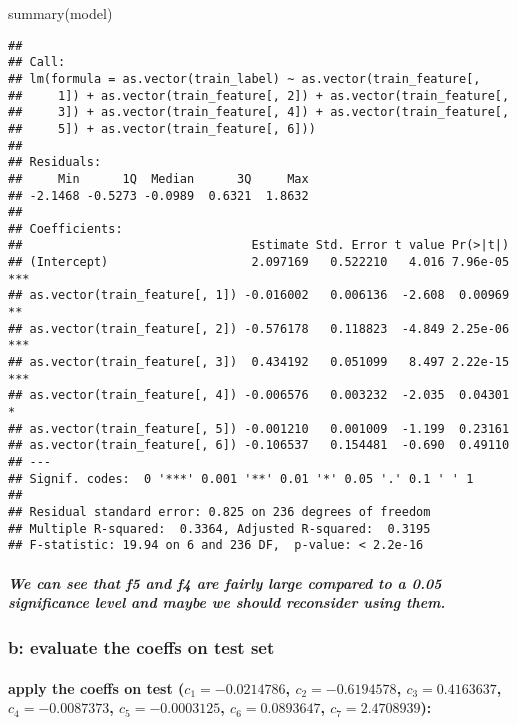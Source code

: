 \documentclass[
]{article}
\newenvironment{Shaded}{\begin{snugshade}}{\end{snugshade}}
\newcommand{\FunctionTok}[1]{\textcolor[rgb]{0.00,0.00,0.00}{#1}}
\newcommand{\NormalTok}[1]{#1}
\begin{document}
\begin{Shaded}
\begin{Highlighting}[]
\FunctionTok{summary}\NormalTok{(model)}
\end{Highlighting}
\end{Shaded}

\begin{verbatim}
## 
## Call:
## lm(formula = as.vector(train_label) ~ as.vector(train_feature[, 
##     1]) + as.vector(train_feature[, 2]) + as.vector(train_feature[, 
##     3]) + as.vector(train_feature[, 4]) + as.vector(train_feature[, 
##     5]) + as.vector(train_feature[, 6]))
## 
## Residuals:
##     Min      1Q  Median      3Q     Max 
## -2.1468 -0.5273 -0.0989  0.6321  1.8632 
## 
## Coefficients:
##                                Estimate Std. Error t value Pr(>|t|)    
## (Intercept)                    2.097169   0.522210   4.016 7.96e-05 ***
## as.vector(train_feature[, 1]) -0.016002   0.006136  -2.608  0.00969 ** 
## as.vector(train_feature[, 2]) -0.576178   0.118823  -4.849 2.25e-06 ***
## as.vector(train_feature[, 3])  0.434192   0.051099   8.497 2.22e-15 ***
## as.vector(train_feature[, 4]) -0.006576   0.003232  -2.035  0.04301 *  
## as.vector(train_feature[, 5]) -0.001210   0.001009  -1.199  0.23161    
## as.vector(train_feature[, 6]) -0.106537   0.154481  -0.690  0.49110    
## ---
## Signif. codes:  0 '***' 0.001 '**' 0.01 '*' 0.05 '.' 0.1 ' ' 1
## 
## Residual standard error: 0.825 on 236 degrees of freedom
## Multiple R-squared:  0.3364, Adjusted R-squared:  0.3195 
## F-statistic: 19.94 on 6 and 236 DF,  p-value: < 2.2e-16
\end{verbatim}

\hypertarget{we-can-see-that-f5-and-f4-are-fairly-large-compared-to-a-0.05-significance-level-and-maybe-we-should-reconsider-using-them.}{%
\subparagraph{We can see that f5 and f4 are fairly large compared to a
0.05 significance level and maybe we should reconsider using
them.}\label{we-can-see-that-f5-and-f4-are-fairly-large-compared-to-a-0.05-significance-level-and-maybe-we-should-reconsider-using-them.}}

\hypertarget{b-evaluate-the-coeffs-on-test-set}{%
\subsubsection{b: evaluate the coeffs on test
set}\label{b-evaluate-the-coeffs-on-test-set}}

\hypertarget{apply-the-coeffs-on-test-c_1-0.0214786-c_2-0.6194578-c_30.4163637-c_4-0.0087373-c_5-0.0003125-c_60.0893647-c_72.4708939}{%
\paragraph{\texorpdfstring{apply the coeffs on test (\(c_1=-0.0214786\),
\(c_2=-0.6194578\), \(c_3=0.4163637\), \(c_4=-0.0087373\),
\(c_5=-0.0003125\), \(c_6=0.0893647\),
\(c_7=2.4708939\)):}{apply the coeffs on test (c\_1=-0.0214786, c\_2=-0.6194578, c\_3=0.4163637, c\_4=-0.0087373, c\_5=-0.0003125, c\_6=0.0893647, c\_7=2.4708939):}}\label{apply-the-coeffs-on-test-c_1-0.0214786-c_2-0.6194578-c_30.4163637-c_4-0.0087373-c_5-0.0003125-c_60.0893647-c_72.4708939}}
\end{document}
